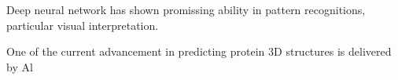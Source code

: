 Deep neural network has shown promissing ability in pattern recognitions, particular visual interpretation.
\par 

One of the current advancement in predicting protein 3D structures is delivered by Al